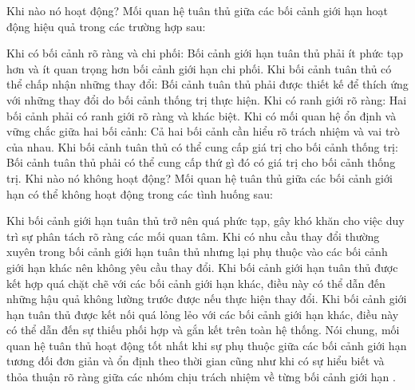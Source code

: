 Khi nào nó hoạt động?
Mối quan hệ tuân thủ giữa các bối cảnh giới hạn hoạt động hiệu quả trong các trường hợp sau:

Khi có bối cảnh rõ ràng và chi phối: Bối cảnh giới hạn tuân thủ phải ít phức tạp hơn và ít quan trọng hơn bối cảnh giới hạn chi phối.
Khi bối cảnh tuân thủ có thể chấp nhận những thay đổi: Bối cảnh tuân thủ phải được thiết kế để thích ứng với những thay đổi do bối cảnh thống trị thực hiện.
Khi có ranh giới rõ ràng: Hai bối cảnh phải có ranh giới rõ ràng và khác biệt.
Khi có mối quan hệ ổn định và vững chắc giữa hai bối cảnh: Cả hai bối cảnh cần hiểu rõ trách nhiệm và vai trò của nhau.
Khi bối cảnh tuân thủ có thể cung cấp giá trị cho bối cảnh thống trị: Bối cảnh tuân thủ phải có thể cung cấp thứ gì đó có giá trị cho bối cảnh thống trị.
Khi nào nó không hoạt động?
Mối quan hệ tuân thủ giữa các bối cảnh giới hạn có thể không hoạt động trong các tình huống sau:

Khi bối cảnh giới hạn tuân thủ trở nên quá phức tạp, gây khó khăn cho việc duy trì sự phân tách rõ ràng các mối quan tâm.
Khi có nhu cầu thay đổi thường xuyên trong bối cảnh giới hạn tuân thủ nhưng lại phụ thuộc vào các bối cảnh giới hạn khác nên không yêu cầu thay đổi.
Khi bối cảnh giới hạn tuân thủ được kết hợp quá chặt chẽ với các bối cảnh giới hạn khác, điều này có thể dẫn đến những hậu quả không lường trước được nếu thực hiện thay đổi.
Khi bối cảnh giới hạn tuân thủ được kết nối quá lỏng lẻo với các bối cảnh giới hạn khác, điều này có thể dẫn đến sự thiếu phối hợp và gắn kết trên toàn hệ thống.
Nói chung, mối quan hệ tuân thủ hoạt động tốt nhất khi sự phụ thuộc giữa các bối cảnh giới hạn tương đối đơn giản và ổn định theo thời gian cũng như khi có sự hiểu biết và thỏa thuận rõ ràng giữa các nhóm chịu trách nhiệm về từng bối cảnh giới hạn .

